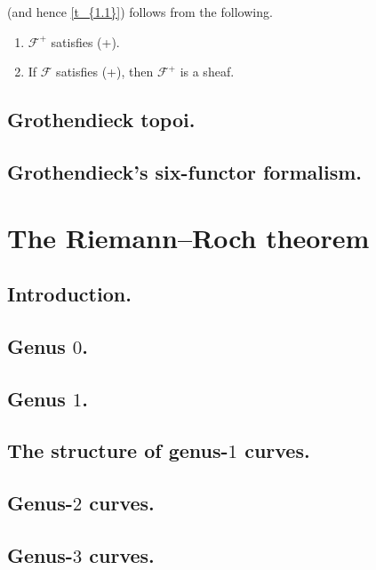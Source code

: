 \documentclass [11 pt, oneside] {article}
\begin{document}
 (and hence \cref{t_{1.1}}) follows from the following.

\begin{lemma}\label{l_{1.4}}\text{}
\begin{enumerate}
\item $\mathscr{F}^+$ satisfies (+).
\item If $\mathscr{F}$ satisfies (+), then $\mathscr{F}^+$ is a sheaf.
\end{enumerate}
\end{lemma}

\begin{eproof}
\item
\end{eproof}




\subsection{Grothendieck topoi.}

\subsection{Grothendieck's six-functor formalism.}


\iffalse
\section{The Riemann--Roch theorem}
\subsection{Introduction.}
\subsection{Genus \texorpdfstring{$0$}{0}.}
\subsection{Genus \texorpdfstring{$1$}{1}.}
\subsection{The structure of genus-\texorpdfstring{$1$}{1} curves.}
\subsection{Genus-\texorpdfstring{$2$}{2} curves.}
\subsection{Genus-\texorpdfstring{$3$}{3} curves.}
\end{document}
